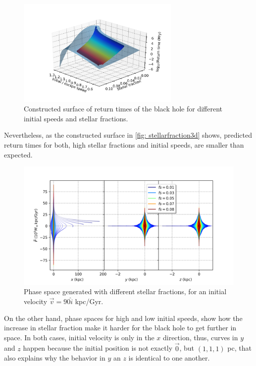 	\begin{figure}[h]
		\centering
		\includegraphics[width = 0.7\textwidth]{"../Files/Week 10/surface"}
		\caption{Constructed surface of return times of the black hole for different initial speeds and stellar fractions.}
		\label{fig: stellarfraction3d}
	\end{figure}

	Nevertheless, as the constructed surface in \autoref{fig: stellarfraction3d} shows, predicted return times for both, high stellar fractions and initial speeds, are smaller than expected.
	
	\begin{figure}[h!]
		\centering
		\includegraphics[width = 0.9\linewidth]{"../Files/Week 9/PhaseSpace_escape"}
		\caption{Phase space generated with different stellar fractions, for an initial velocity $\vec{v} = 90\hat{i}$ kpc/Gyr.}
		\label{fig: escapePhaseSpace}
	\end{figure}

	On the other hand, phase spaces for high and low initial speeds, show how the increase in stellar fraction make it harder for the black hole to get further in space. In both cases, initial velocity is only in the $x$ direction, thus, curves in $y$ and $z$ happen because the initial position is not exactly $\vec{0}$, but $(1, 1, 1)$ pc, that also explains why the behavior in $y$ an $z$ is identical to one another.
	
